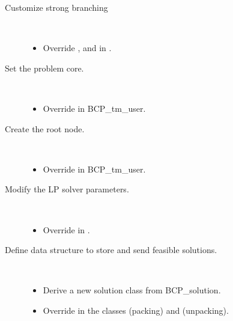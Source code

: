 \begin{description}
\item[Customize strong branching]\ \\
  \vspace{-4ex}
  \begin{itemize}
    \setlength{\itemindent}{-4ex}
    \setlength{\itemsep}{-.5ex}
  \item Override , 
    and  in .
  \end{itemize}

\item[Set the problem core.]\ \\
  \vspace{-4ex}
  \begin{itemize}
    \setlength{\itemindent}{-4ex}
    \setlength{\itemsep}{-.5ex}
  \item Override  in {BCP\_tm\_user}.
  \end{itemize}

\item[Create the root node.]\ \\
  \vspace{-4ex}
  \begin{itemize}
    \setlength{\itemindent}{-4ex}
    \setlength{\itemsep}{-.5ex}
  \item Override  in {BCP\_tm\_user}.
  \end{itemize}

\item[Modify the LP solver parameters.]\ \\
  \vspace{-4ex}
  \begin{itemize}
    \setlength{\itemindent}{-4ex}
    \setlength{\itemsep}{-.5ex}
  \item Override  in .
  \end{itemize}

\item[Define data structure to store and send feasible solutions.]\ \\
  \vspace{-4ex}
  \begin{itemize}
    \setlength{\itemindent}{-4ex}
    \setlength{\itemsep}{-.5ex}
  \item Derive a new solution class from {BCP\_solution}.
  \item Override  in the classes 
     (packing) and  (unpacking).
  \end{itemize}


\end{description}

